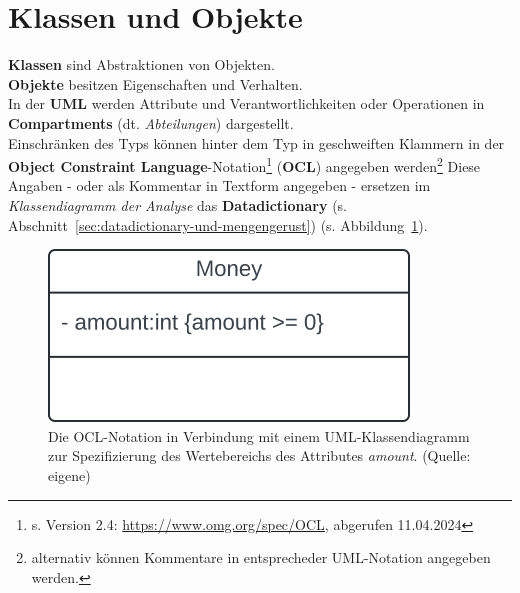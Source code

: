 \section{Klassen und Objekte}

\noindent
\textbf{Klassen} sind Abstraktionen von Objekten.\\

\noindent
\textbf{Objekte} besitzen Eigenschaften und Verhalten.\\

\noindent
In der \textbf{UML} werden Attribute und Verantwortlichkeiten oder Operationen in \textbf{Compartments} (dt. \textit{Abteilungen}) dargestellt.\\

\noindent
Einschränken des Typs können hinter dem Typ in geschweiften Klammern in der \textbf{Object Constraint Language}-Notation\footnote{
s. Version 2.4: \url{https://www.omg.org/spec/OCL}, abgerufen 11.04.2024
} (\textbf{OCL}) angegeben werden\footnote{
alternativ können Kommentare in entsprecheder UML-Notation angegeben werden.
}
Diese Angaben - oder als Kommentar in Textform angegeben - ersetzen im \textit{Klassendiagramm der Analyse} das \textbf{Datadictionary} (s. Abschnitt~\ref{sec:datadictionary-und-mengengerust}) (s. Abbildung~\ref{fig:moneyocl}).

\begin{figure}
    \centering
    \includegraphics[scale=0.4]{part two/Objektorientierte Analyse/img/moneyocl}
    \caption{Die OCL-Notation in Verbindung mit einem UML-Klassendiagramm zur Spezifizierung des Wertebereichs des Attributes \textit{amount}. (Quelle: eigene)}
    \label{fig:moneyocl}
\end{figure}